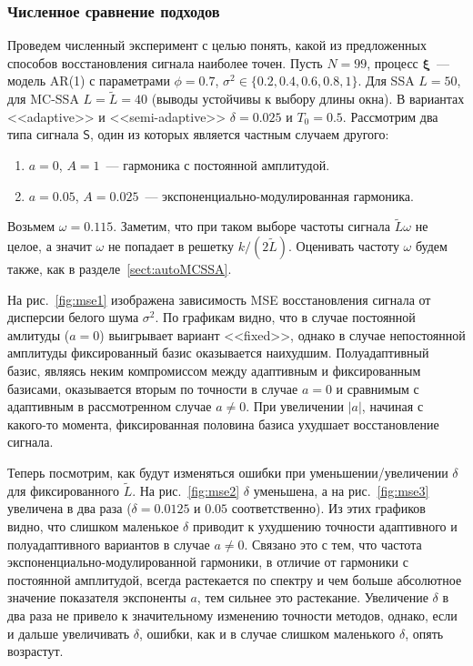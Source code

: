 \documentclass[specialist,
substylefile = spbu_report.rtx,
subf,href,colorlinks=true, 12pt]{disser}
\theoremstyle{definition}
\begin{document}
\subsubsection{Численное сравнение подходов}

Проведем численный эксперимент с целью понять, какой из предложенных способов восстановления сигнала наиболее точен. Пусть $N=99$, процесс $\bm\xi$~--- модель AR(1) с параметрами $\phi=0.7$, $\sigma^2\in\{0.2, 0.4, 0.6, 0.8, 1\}$. Для SSA $L=50$, для MC-SSA $L=\widetilde L=40$ (выводы устойчивы к выбору длины окна). В вариантах <<adaptive>> и <<semi-adaptive>> $\delta=0.025$ и $T_0=0.5$. Рассмотрим два типа сигнала $\mathsf{S}$, один из которых является частным случаем другого:
\begin{enumerate}
    \item $a=0$, $A=1$~--- гармоника с постоянной амплитудой.
    \item $a=0.05$, $A=0.025$~--- экспоненциально-модулированная гармоника.
\end{enumerate}
Возьмем $\omega=0.115$. Заметим, что при таком выборе частоты сигнала $\widetilde L \omega$ не целое, а значит $\omega$ не попадает в решетку $k/(2\widetilde L)$. Оценивать частоту $\omega$ будем также, как в разделе~\ref{sect:autoMCSSA}.

На рис.~\ref{fig:mse1} изображена зависимость MSE восстановления сигнала от дисперсии белого шума $\sigma^2$. По графикам видно, что в случае постоянной амлитуды ($a=0$) выигрывает вариант <<fixed>>, однако в случае непостоянной амплитуды фиксированный базис оказывается наихудшим. Полуадаптивный базис, являясь неким компромиссом между адаптивным и фиксированным базисами, оказывается вторым по точности в случае $a=0$ и сравнимым с адаптивным в рассмотренном случае $a\ne0$. При увеличении $|a|$, начиная с какого-то момента, фиксированная половина базиса ухудшает восстановление сигнала.

Теперь посмотрим, как будут изменяться ошибки при уменьшении/увеличении $\delta$ для фиксированного $\widetilde L$. На рис.~\ref{fig:mse2} $\delta$ уменьшена, а на рис.~\ref{fig:mse3} увеличена в два раза ($\delta=0.0125$ и $0.05$ соответственно). Из этих графиков видно, что слишком маленькое $\delta$ приводит к ухудшению точности адаптивного и полуадаптивного вариантов в случае $a\ne0$. Связано это с тем, что частота экспоненциально-модулированной гармоники, в отличие от гармоники с постоянной амплитудой, всегда растекается по спектру и чем больше абсолютное значение показателя экспоненты $a$, тем сильнее это растекание. Увеличение $\delta$ в два раза не привело к значительному изменению точности методов, однако, если и дальше увеличивать $\delta$, ошибки, как и в случае слишком маленького $\delta$, опять возрастут.
\end{document}
